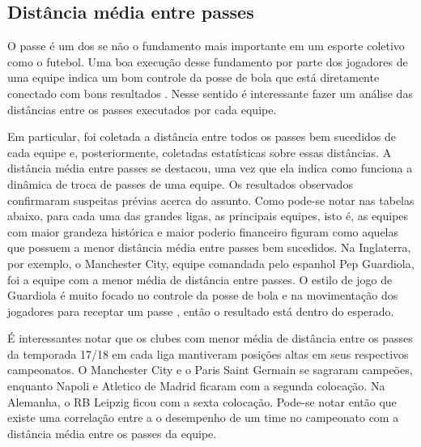 \documentclass{article}
\begin{document}
\subsection{Distância média entre passes}

O passe é um dos se não o fundamento mais importante em um esporte coletivo
como o futebol. Uma boa execução desse fundamento por parte dos jogadores
de uma equipe indica um bom controle da posse de bola que está diretamente
conectado com bons resultados \cite{cox2022linhas}. Nesse sentido é
interessante fazer um análise
das distâncias entre os passes
executados por cada equipe.

Em particular, foi coletada a distância entre todos os passes bem sucedidos de
cada equipe e, posteriormente, coletadas estatísticas sobre essas distâncias. A
distância média
entre passes se destacou, uma vez que ela indica como funciona a dinâmica de
troca de passes de uma equipe. Os resultados observados confirmaram suspeitas
prévias acerca do assunto.
Como pode-se notar nas tabelas abaixo, para cada uma das grandes ligas, as
principais equipes, isto é, as equipes com maior grandeza histórica e maior
poderio financeiro figuram como aquelas
que possuem a menor distância média entre passes bem sucedidos. Na Inglaterra,
por exemplo, o Manchester City, equipe comandada pelo espanhol Pep Guardiola,
foi a equipe com a menor média
de distância entre passes. O estilo de jogo de Guardiola é muito focado no
controle da posse de bola e na movimentação dos jogadores para receptar um
passe \cite{terzis2023pep}, então o resultado está dentro do
esperado.

É interessantes notar que os clubes com menor média de distância entre os
passes da temporada 17/18 em cada liga mantiveram posições altas em seus
respectivos campeonatos. O Manchester City e o Paris Saint Germain se sagraram
campeões, enquanto Napoli e Atletico de Madrid ficaram com a segunda colocação.
Na Alemanha, o RB Leipzig ficou com a sexta colocação. Pode-se notar então que
existe uma correlação entre a o desempenho de um time no campeonato com a
distância média entre os passes da equipe.
\end{document}
